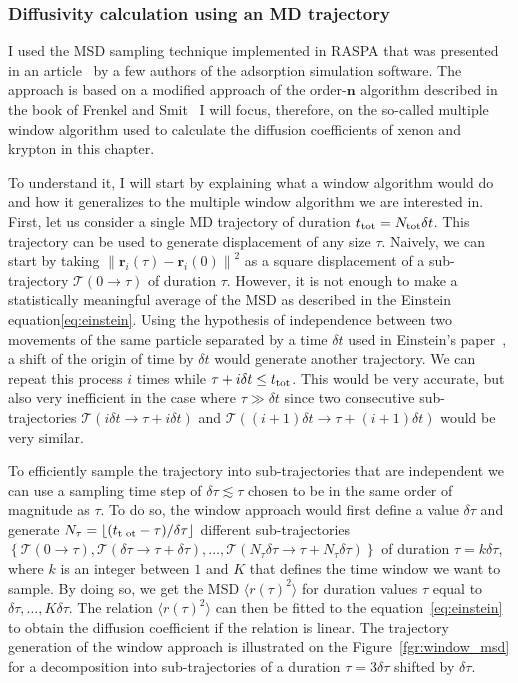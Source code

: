 \documentclass[main]{subfiles}
\begin{document}
\subsubsection{Diffusivity calculation using an MD trajectory}

I used the MSD sampling technique implemented in RASPA\autocite{dubbeldam2016} that was presented in an article~\cite{Dubbeldam_2009} by a few authors of the adsorption simulation software. The approach is based on a modified approach of the order-$\mathbf{n}$ algorithm described in the book of Frenkel and Smit~\cite{frenkel2001msd} I will focus, therefore, on the so-called multiple window algorithm used to calculate the diffusion coefficients of xenon and krypton in this chapter. 

To understand it, I will start by explaining what a window algorithm would do and how it generalizes to the multiple window algorithm we are interested in.
First, let us consider a single MD trajectory of duration $t_{\text{tot}}=N_{\text{tot}}\delta t$. This trajectory can be used to generate displacement of any size $\tau$. Naively, we can start by taking ${\lVert\mathbf{r}_i(\tau)-\mathbf{r}_i(0)\rVert}^2$ as a square displacement of a sub-trajectory $\mathcal{T}(0\rightarrow\tau)$ of duration $\tau$. 
However, it is not enough to make a statistically meaningful average of the MSD as described in the Einstein equation\ref{eq:einstein}. Using the hypothesis of independence between two movements of the same particle separated by a time $\delta t$ used in Einstein's paper~\cite{einstein1905motion}, a shift of the origin of time by $\delta t$ would generate another trajectory. We can repeat this process $i$ times while $\tau + i\delta t\leq t_{\text{tot}}$. This would be very accurate, but also very inefficient in the case where $\tau \gg \delta t$ since two consecutive sub-trajectories $\mathcal{T}(i\delta t\rightarrow\tau+i\delta t)$ and $\mathcal{T}((i+1)\delta t\rightarrow\tau+(i+1)\delta t)$ would be very similar. 

To efficiently sample the trajectory into sub-trajectories that are independent we can use a sampling time step of $\delta \tau\lesssim\tau$ chosen to be in the same order of magnitude as $\tau$. To do so, the window approach would first define a value $\delta \tau$ and generate $N_{\tau} = \lfloor(t_{\text{t ot}} -\tau)/ \delta\tau \rfloor$ different sub-trajectories $\left\{\mathcal{T}(0\rightarrow\tau), \mathcal{T}(\delta\tau\rightarrow\tau + \delta\tau), \ldots, \mathcal{T}(N_{\tau}\delta\tau\rightarrow\tau + N_{\tau}\delta\tau)\right\}$ of duration $\tau=k\delta\tau$, where $k$ is an integer between $1$ and $K$ that defines the time window we want to sample. By doing so, we get the MSD $\langle {r(\tau)}^2 \rangle$ for duration values $\tau$ equal to $\delta\tau, \ldots, K\delta\tau$. The relation $\langle {r(\tau)}^2 \rangle$ can then be fitted to the equation~\ref{eq:einstein} to obtain the diffusion coefficient if the relation is linear. The trajectory generation of the window approach is illustrated on the Figure~\ref{fgr:window_msd} for a decomposition into sub-trajectories of a duration $\tau=3\delta\tau$ shifted by $\delta\tau$.
\end{document}
